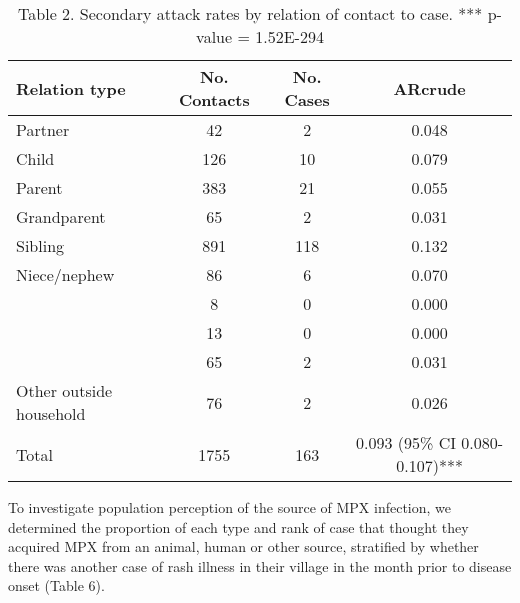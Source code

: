 \begin{table}[!hb]
    \begin{tabular}{@{}lccc@{}}
    \toprule
    Relation type & No. Contacts & No. Cases & ARcrude \\
    \cmidrule
    Partner & 42 & 2 & 0.048 \\ 
    Child & 126 & 10 & 0.079 \\                  
    Parent & 383 & 21 & 0.055 \\
    Grandparent & 65       & 2     & 0.031 \\
    Sibling & 891      & 118   & 0.132 \\
    Niece/nephew & 86       & 6     & 0.070 \\
    ~   & 8        & 0     & 0.000 \\
    ~   & 13       & 0     & 0.000  \\
    ~   & 65       & 2     & 0.031  \\
    Other outside household & 76 & 2 & 0.026 \\
    Total & 1755 & 163 & 0.093 (95\% CI 0.080-0.107)*** \\
    \bottomrule
    \end{tabular}
    \caption{Table 2. Secondary attack rates by relation of contact to case. *** p-value = 1.52E-294}
    \label{table2}
\end{table}


To investigate population perception of the source of MPX infection, we determined the proportion of each type and rank of case that thought they acquired MPX from an animal, human or other source, stratified by whether there was another case of rash illness in their village in the month prior to disease onset (Table 6). 
